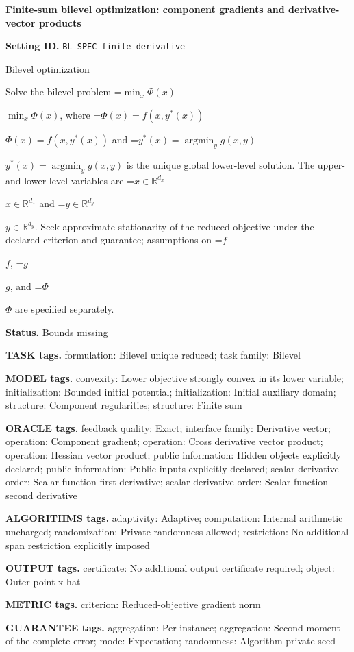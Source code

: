 \documentclass[10pt,a4paper]{article}
\newcommand{\AtlasMath}[1]{\par\begingroup\centering\setbox0=\hbox{$\displaystyle #1$}\ifdim\wd0>1.4\linewidth\typeout{ATLAS WIDE FORMULA: \the\wd0}\fi\ifdim\wd0>\linewidth\resizebox{\linewidth}{!}{\box0}\else\box0\fi\par\endgroup}
\newcommand{\AtlasInlineMath}[1]{\begingroup\setbox0=\hbox{$#1$}\ifdim\wd0>.4\linewidth\endgroup\AtlasMath{#1}\else\endgroup$#1$\fi}
\begin{document}
\raggedright

{\LARGE\bfseries\sffamily\color{AtlasNavy} Finite-sum bilevel optimization: component gradients and derivative-vector products\par}\vspace{5pt}
\textbf{Setting ID.} \texttt{BL\_\allowbreak{}\allowbreak{}SPEC\_\allowbreak{}\allowbreak{}finite\_\allowbreak{}\allowbreak{}derivative}

Bilevel optimization

Solve the bilevel problem \AtlasInlineMath{\min_x\Phi(x)}, where \AtlasInlineMath{\Phi(x)=f(x,y^*(x))} and \AtlasInlineMath{y^*(x)=\operatorname*{argmin}_y g(x,y)} is the unique global lower-level solution. The upper- and lower-level variables are \AtlasInlineMath{x\in\mathbb{R}^{d_x}} and \AtlasInlineMath{y\in\mathbb{R}^{d_y}}. Seek approximate stationarity of the reduced objective under the declared criterion and guarantee; assumptions on \AtlasInlineMath{f}, \AtlasInlineMath{g}, and \AtlasInlineMath{\Phi} are specified separately.

\textbf{Status.} Bounds missing

\textbf{TASK tags.} formulation: Bilevel unique reduced; task family: Bilevel

\textbf{MODEL tags.} convexity: Lower objective strongly convex in its lower variable; initialization: Bounded initial potential; initialization: Initial auxiliary domain; structure: Component regularities; structure: Finite sum

\textbf{ORACLE tags.} feedback quality: Exact; interface family: Derivative vector; operation: Component gradient; operation: Cross derivative vector product; operation: Hessian vector product; public information: Hidden objects explicitly declared; public information: Public inputs explicitly declared; scalar derivative order: Scalar-function first derivative; scalar derivative order: Scalar-function second derivative

\textbf{ALGORITHMS tags.} adaptivity: Adaptive; computation: Internal arithmetic uncharged; randomization: Private randomness allowed; restriction: No additional span restriction explicitly imposed

\textbf{OUTPUT tags.} certificate: No additional output certificate required; object: Outer point x hat

\textbf{METRIC tags.} criterion: Reduced-objective gradient norm

\textbf{GUARANTEE tags.} aggregation: Per instance; aggregation: Second moment of the complete error; mode: Expectation; randomness: Algorithm private seed
\end{document}
